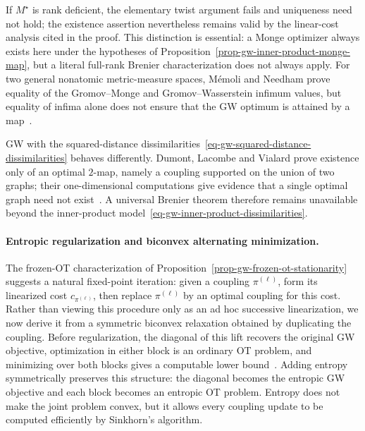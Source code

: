 If $M^\star$ is rank deficient, the elementary twist argument fails and uniqueness need not hold; the existence assertion nevertheless remains valid by the linear-cost analysis cited in the proof. This distinction is essential: a Monge optimizer always exists here under the hypotheses of Proposition~\ref{prop-gw-inner-product-monge-map}, but a literal full-rank Brenier characterization does not always apply. For two general nonatomic metric-measure spaces, M\'emoli and Needham prove equality of the Gromov--Monge and Gromov--Wasserstein infimum values, but equality of infima alone does not ensure that the GW optimum is attained by a map~\cite{MemoliNeedham2024}.

GW with the squared-distance dissimilarities~\eqref{eq-gw-squared-distance-dissimilarities} behaves differently. Dumont, Lacombe and Vialard prove existence only of an optimal $2$-map, namely a coupling supported on the union of two graphs; their one-dimensional computations give evidence that a single optimal graph need not exist~\cite{DumontLacombeVialard2025}. A universal Brenier theorem therefore remains unavailable beyond the inner-product model~\eqref{eq-gw-inner-product-dissimilarities}.

\paragraph{Entropic regularization and biconvex alternating minimization.}

The frozen-OT characterization of Proposition~\ref{prop-gw-frozen-ot-stationarity} suggests a natural fixed-point iteration: given a coupling $\pi^{(\ell)}$, form its linearized cost $c_{\pi^{(\ell)}}$, then replace $\pi^{(\ell)}$ by an optimal coupling for this cost. Rather than viewing this procedure only as an ad hoc successive linearization, we now derive it from a symmetric biconvex relaxation obtained by duplicating the coupling. Before regularization, the diagonal of this lift recovers the original GW objective, optimization in either block is an ordinary OT problem, and minimizing over both blocks gives a computable lower bound~\cite{peyre2016gromov}. Adding entropy symmetrically preserves this structure: the diagonal becomes the entropic GW objective and each block becomes an entropic OT problem. Entropy does not make the joint problem convex, but it allows every coupling update to be computed efficiently by Sinkhorn's algorithm.

